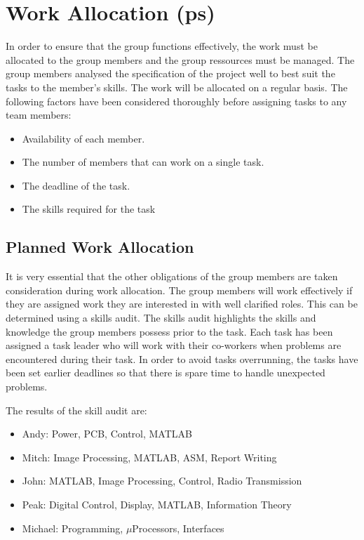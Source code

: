 
\section{Work Allocation (ps)}

In order to ensure that the group functions effectively, the work must be allocated to the group members and the group ressources must be managed. The group members analysed the specification of the project well to best suit the tasks to the member's skills. The work will be allocated on a regular basis. The following factors have been considered thoroughly before assigning tasks to any team members:

\begin{itemize}
\item	Availability of each member. 

\item	The number of members that can work on a single task.

\item  The deadline of the task.

\item	The skills required for the task
\end{itemize}


\subsection*{Planned Work Allocation}
\label{sec:work_plan}

It is very essential that the other obligations of the group members are taken consideration during work allocation. 
The group members will work effectively if they are assigned work they are interested in with well clarified roles. This can be determined using a skills audit.
The skills audit highlights the skills and knowledge the group members possess prior to the task. 
Each task has been assigned a task leader who will work with their co-workers when problems are encountered during their task.
In order to avoid tasks overrunning, the tasks have been set earlier deadlines so that there is spare time to handle unexpected problems. 

The results of the skill audit are:

\begin{itemize}
\item Andy: Power, PCB, Control, MATLAB
\item Mitch: Image Processing, MATLAB, ASM, Report Writing
\item John: MATLAB, Image Processing, Control, Radio Transmission
\item Peak: Digital Control, Display, MATLAB, Information Theory
\item Michael: Programming, $\mu$Processors, Interfaces
\end{itemize}


